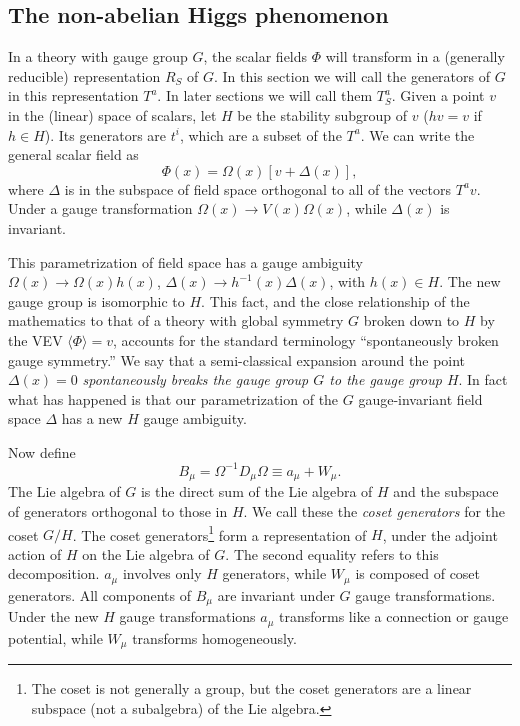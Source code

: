 \subsection{The non-abelian Higgs phenomenon}

In a theory with gauge group $G$, the scalar fields $\Phi$ will transform in a
(generally reducible) representation $R_S$ of $G$. In this section we will call
the generators of $G$ in this representation $T^a$. In later sections we will
call them $T_S^a$. Given a point $v$ in the (linear) space of scalars, let $H$
be the stability subgroup of $v$ ($hv=v$ if $h\in H$). Its generators are
$t^i$, which are a subset of the $T^a$. We can write the general scalar field
as
\begin{equation*}
  \Phi(x)=\Omega(x)[v+\Delta(x)],
\end{equation*}
where $\Delta$ is in the subspace of field space orthogonal to all of the
vectors $T^av$. Under a gauge transformation $\Omega(x)\to V(x)\Omega(x)$,
while $\Delta(x)$ is invariant.

This parametrization of field space has a gauge ambiguity
$\Omega(x)\to\Omega(x)h(x)$, $\Delta(x)\to h^{-1}(x)\Delta(x)$, with
$h(x)\in H$. The new gauge group is isomorphic to $H$. This fact, and the close
relationship of the mathematics to that of a theory with global symmetry $G$
broken down to $H$ by the VEV $\langle\Phi\rangle=v$, accounts for the
standard terminology ``spontaneously broken gauge symmetry.'' We say that a
semi-classical expansion around the point $\Delta(x)=0$ \emph{spontaneously
breaks the gauge group $G$ to the gauge group $H$}. In fact what has happened
is that our parametrization of the $G$ gauge-invariant field space $\Delta$ has
a new $H$ gauge ambiguity.

Now define
\begin{equation*}
  B_\mu=\Omega^{-1}D_\mu\Omega\equiv a_\mu+W_\mu.
\end{equation*}
The Lie algebra of $G$ is the direct sum of the Lie algebra of $H$ and the
subspace of generators orthogonal to those in $H$. We call these the
\emph{coset generators} for the coset $G/H$. The coset generators\footnote[2]{The
coset is not generally a group, but the coset generators are a linear subspace
(not a subalgebra) of the Lie algebra.} form a representation of $H$, under the
adjoint action of $H$ on the Lie algebra of $G$. The second equality refers to
this decomposition. $a_\mu$ involves only $H$ generators, while $W_\mu$ is
composed of coset generators. All components of $B_\mu$ are invariant under
$G$ gauge transformations. Under the new $H$ gauge transformations $a_\mu$
transforms like a connection or gauge potential, while $W_\mu$ transforms
homogeneously.

